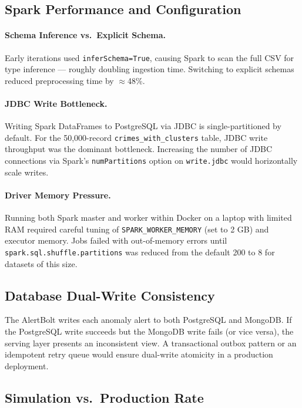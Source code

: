 \documentclass[11pt,a4paper]{article}
\begin{document}
\subsection{Spark Performance and Configuration}

\paragraph{Schema Inference vs.\ Explicit Schema.}
Early iterations used \texttt{inferSchema=True}, causing Spark to scan
the full CSV for type inference — roughly doubling ingestion time.
Switching to explicit schemas reduced preprocessing time by $\approx$48\%.

\paragraph{JDBC Write Bottleneck.}
Writing Spark DataFrames to PostgreSQL via JDBC is single-partitioned by
default. For the 50{,}000-record \texttt{crimes\_with\_clusters} table,
JDBC write throughput was the dominant bottleneck. Increasing the number
of JDBC connections via Spark's \texttt{numPartitions} option on
\texttt{write.jdbc} would horizontally scale writes.

\paragraph{Driver Memory Pressure.}
Running both Spark master and worker within Docker on a laptop with
limited RAM required careful tuning of \texttt{SPARK\_WORKER\_MEMORY}
(set to 2 GB) and executor memory. Jobs failed with out-of-memory errors
until \texttt{spark.sql.shuffle.partitions} was reduced from the default
200 to 8 for datasets of this size.

\subsection{Database Dual-Write Consistency}

The AlertBolt writes each anomaly alert to both PostgreSQL and MongoDB.
If the PostgreSQL write succeeds but the MongoDB write fails (or vice
versa), the serving layer presents an inconsistent view. A
transactional outbox pattern or an idempotent retry queue would ensure
dual-write atomicity in a production deployment.

\subsection{Simulation vs.\ Production Rate}
\end{document}

